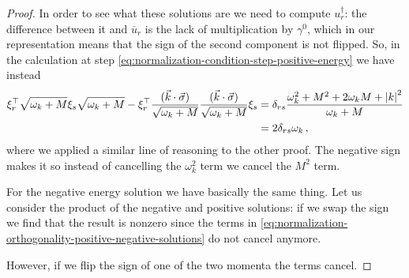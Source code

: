 \documentclass[main.tex]{subfiles}
\begin{document}
\begin{proof}
In order to see what these solutions are we need to compute \(u_{r} ^\dag\): the difference between it and \(\overline{u}_{r}\) is the lack of multiplication by \(\gamma^{0}\), which in our representation means that the sign of the second component is not flipped. 
So, in the calculation at step \eqref{eq:normalization-condition-step-positive-energy} we have instead 
%
\begin{subequations}
\begin{align}
\xi_{r}^{\top} \sqrt{\omega_{k} +M }
\xi_{s} \sqrt{\omega_{k} + M}
- \xi_{r}^{\top} 
\frac{(\vec{k} \cdot \vec{\sigma})}{\sqrt{\omega_{k} + M}}
\frac{(\vec{k} \cdot \vec{\sigma})}{\sqrt{\omega_{k} + M}}
\xi_{s}
&= \delta_{rs} \frac{\omega_{k}^2 + M^2 + 2 \omega_{k} M + \abs{k}^2}{\omega_{k} + M}  \\
&=2 \delta_{rs} \omega_{k}
\,,
\end{align}
\end{subequations}
%
where we applied a similar line of reasoning to the other proof. The negative sign makes it so instead of cancelling the \(\omega_{k}^2\) term we cancel the \(M^2\) term.

For the negative energy solution we have basically the same thing.
Let us consider the product of the negative and positive solutions: if we swap the sign we find that the result is nonzero since the terms in \eqref{eq:normalization-orthogonality-positive-negative-solutions} do not cancel anymore. 

However, if we flip the sign of one of the two momenta the terms cancel.
\end{proof}
\end{document}

